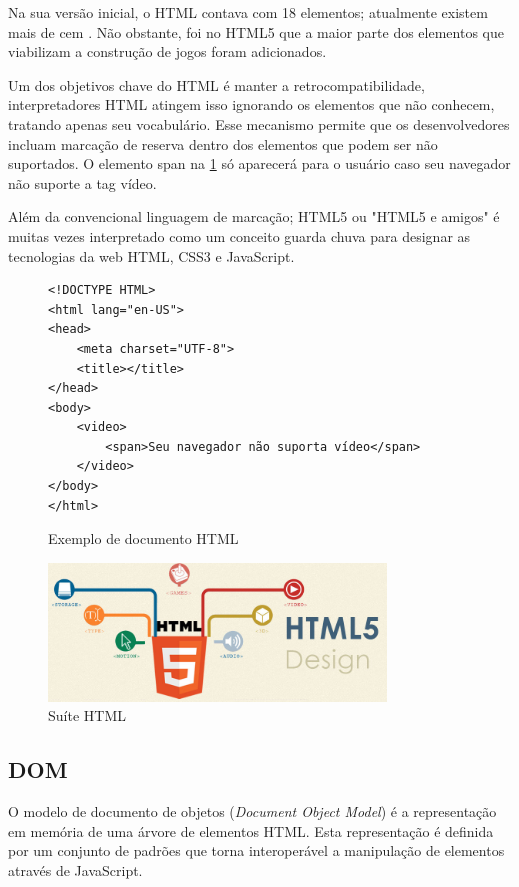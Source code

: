 \documentclass[
12pt,
a4paper,
portuges,
draft
]{report}
\begin{document}
Na sua versão inicial, o HTML contava com 18 elementos;
atualmente existem mais de cem \autocite{diveIntohtml}.
Não obstante, foi no HTML5 que a maior parte dos elementos
que viabilizam a construção de jogos foram adicionados.

Um dos objetivos chave do HTML é manter a retrocompatibilidade,
interpretadores HTML atingem isso ignorando os elementos que não
conhecem, tratando apenas seu vocabulário. Esse mecanismo permite que
os desenvolvedores incluam marcação de reserva dentro dos elementos
que podem ser não suportados. O elemento span na \ref{fig:htmlSample}
só aparecerá para o usuário caso seu navegador não suporte a tag
vídeo.

Além da convencional linguagem de marcação; HTML5 ou "HTML5 e amigos"
é muitas vezes interpretado como um conceito guarda chuva para designar
as tecnologias da web HTML, CSS3 e JavaScript.

\begin{figure}
\centering
\begin{verbatim}
<!DOCTYPE HTML>
<html lang="en-US">
<head>
	<meta charset="UTF-8">
	<title></title>
</head>
<body>
    <video>
        <span>Seu navegador não suporta vídeo</span>
    </video>
</body>
</html>
\end{verbatim}
\caption{Exemplo de documento HTML}
\label{fig:htmlSample}
\end{figure}

\begin{figure}
    \centering
    \includegraphics[width=0.8\textwidth,natwidth=610,natheight=642]{html5.jpg}
    \caption{Suíte HTML}
\end{figure}
\subsection{DOM}

O modelo de documento de objetos (\textit{Document Object Model}) é a representação
em memória de uma árvore de elementos HTML. Esta representação é definida por
um conjunto de padrões que torna interoperável a manipulação de elementos através de
JavaScript.
\end{document}
